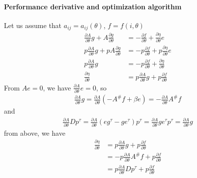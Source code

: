 \documentclass[runningheads]{llncs}
\begin{document}
    \paragraph{Performance derivative and optimization algorithm}
    Let us assume that $a_{ij} = a_{ij}(\theta)$, $f = f(i, \theta)$
    \begin{align}
        \frac{\partial A}{\partial \theta} g + A \frac{\partial g}{\partial \theta}
        &= - \frac{\partial f}{\partial \theta} + \frac{\partial \eta}{\partial \theta} e \\
        p\frac{\partial A}{\partial \theta} g + pA \frac{\partial g}{\partial \theta}
        &= - p\frac{\partial f}{\partial \theta} + p\frac{\partial \eta}{\partial \theta} e \\
        p\frac{\partial A}{\partial \theta} g &= - p\frac{\partial f}{\partial \theta} + \frac{\partial \eta}{\partial \theta} \\
        \frac{\partial \eta}{\partial \theta} &= p\frac{\partial A}{\partial \theta} g + p\frac{\partial f}{\partial \theta}
    \end{align}
    From $Ae = 0$, we have $\frac{\partial A}{\partial \theta} e = 0$,
    so
    \begin{align}
        \frac{\partial A}{\partial \theta}g = 
        \frac{\partial A}{\partial \theta}(-A^\# f + \beta e) =
        - \frac{\partial A}{\partial \theta}A^\# f
    \end{align}
    and
    \begin{align}
        \frac{\partial A}{\partial \theta} D p^\tau = 
        \frac{\partial A}{\partial \theta} (eg^\tau - ge^\tau)p^\tau = 
        \frac{\partial A}{\partial \theta} ge^\tau p^\tau = 
        \frac{\partial A}{\partial \theta} g
    \end{align}
    from above, we have
    \begin{align}
        \frac{\partial \eta}{\partial \theta} &=
        p\frac{\partial A}{\partial \theta} g +
        p\frac{\partial f}{\partial \theta} \\
        &= 
        - p\frac{\partial A}{\partial \theta} A^\#f +
        p\frac{\partial f}{\partial \theta} \\
        &= 
        p\frac{\partial A}{\partial \theta} Dp^\tau +
        p\frac{\partial f}{\partial \theta}
    \end{align}

    
\end{document}
